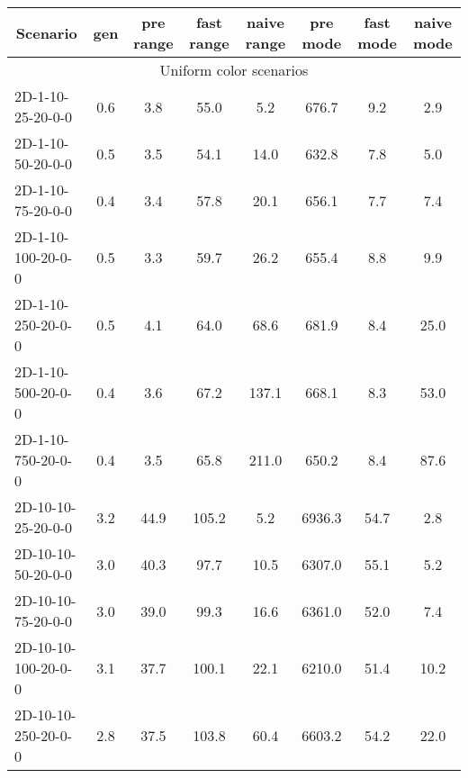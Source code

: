 \documentclass{article}
\begin{document}
\begin{table}[h]
    \begin{center}
        \begin{tabular}{|l||c|c|c|c|c|c|c|}
            \hline
            \multicolumn{1}{|c|}{Scenario} & gen  & pre range & fast range & naive range & pre mode & fast mode & naive mode \\
            \hline
            \hline
            \multicolumn{8}{|c|}{Uniform color scenarios}                                                                    \\
            \hline
            2D-1-10-25-20-0-0              & 0.6  & 3.8       & 55.0       & 5.2         & 676.7    & 9.2       & 2.9        \\
            2D-1-10-50-20-0-0              & 0.5  & 3.5       & 54.1       & 14.0        & 632.8    & 7.8       & 5.0        \\
            2D-1-10-75-20-0-0              & 0.4  & 3.4       & 57.8       & 20.1        & 656.1    & 7.7       & 7.4        \\
            2D-1-10-100-20-0-0             & 0.5  & 3.3       & 59.7       & 26.2        & 655.4    & 8.8       & 9.9        \\
            2D-1-10-250-20-0-0             & 0.5  & 4.1       & 64.0       & 68.6        & 681.9    & 8.4       & 25.0       \\
            2D-1-10-500-20-0-0             & 0.4  & 3.6       & 67.2       & 137.1       & 668.1    & 8.3       & 53.0       \\
            2D-1-10-750-20-0-0             & 0.4  & 3.5       & 65.8       & 211.0       & 650.2    & 8.4       & 87.6       \\
            \hline
            2D-10-10-25-20-0-0             & 3.2  & 44.9      & 105.2      & 5.2         & 6936.3   & 54.7      & 2.8        \\
            2D-10-10-50-20-0-0             & 3.0  & 40.3      & 97.7       & 10.5        & 6307.0   & 55.1      & 5.2        \\
            2D-10-10-75-20-0-0             & 3.0  & 39.0      & 99.3       & 16.6        & 6361.0   & 52.0      & 7.4        \\
            2D-10-10-100-20-0-0            & 3.1  & 37.7      & 100.1      & 22.1        & 6210.0   & 51.4      & 10.2       \\
            2D-10-10-250-20-0-0            & 2.8  & 37.5      & 103.8      & 60.4        & 6603.2   & 54.2      & 22.0       \\

\end{tabular}
\end{center}
\end{table}
\end{document}
